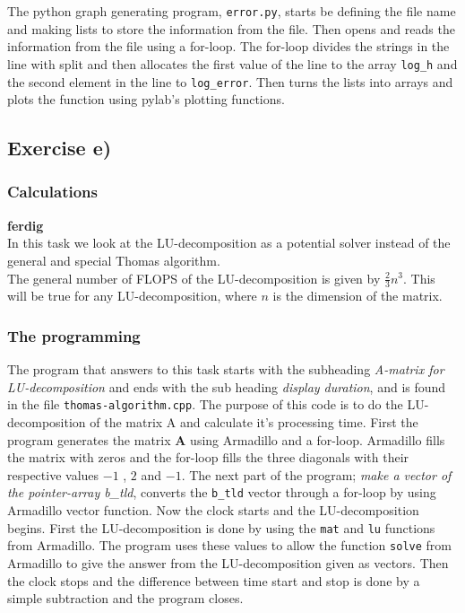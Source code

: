 \documentclass{article}
\begin{document}
    The python graph generating program, \texttt{error.py}, starts be defining the file name and making lists to store the information from the file. Then opens and reads the information from the file using a for-loop. The for-loop divides the strings in the line with split and then allocates the first value of the line to the array \texttt{log\_h} and the second element in the line to \texttt{log\_error}. Then turns the lists into arrays and plots the function using pylab's plotting functions.


\subsection{Exercise e)} \label{sec:Method e)}


  \subsubsection{Calculations}

    {\bf ferdig} \\

    In this task we look at the LU-decomposition as a potential solver instead of the general and special Thomas algorithm. \\

    The general number of FLOPS of the LU-decomposition is given by $ \frac{2}{3} n^3$. This will be true for any LU-decomposition, where $n$ is the dimension of the matrix.


  \subsubsection{The programming}


    The program that answers to this task starts with the subheading \textit{A-matrix for LU-decomposition} and ends with the sub heading \textit{display duration}, and is found in the file \texttt{thomas-algorithm.cpp}. The purpose of this code is to do the LU-decomposition of the matrix A and calculate it's processing time. First the program generates the matrix \textbf{A} using Armadillo and a for-loop. Armadillo fills the matrix with zeros and the for-loop fills the three diagonals with their respective values $-1$ , $2$ and $ -1$. The next part of the program; \textit{make a vector of the pointer-array b\_tld}, converts the \texttt{b\_tld} vector through a for-loop by using Armadillo vector function. Now the clock starts and the LU-decomposition begins. First the LU-decomposition is done by using the \texttt{mat} and \texttt{lu} functions from Armadillo. The program uses these values to allow the function \texttt{solve} from Armadillo to give the answer from the LU-decomposition given as vectors. Then the clock stops and the difference between time start and stop is done by a simple subtraction and the program closes. \\
\end{document}
